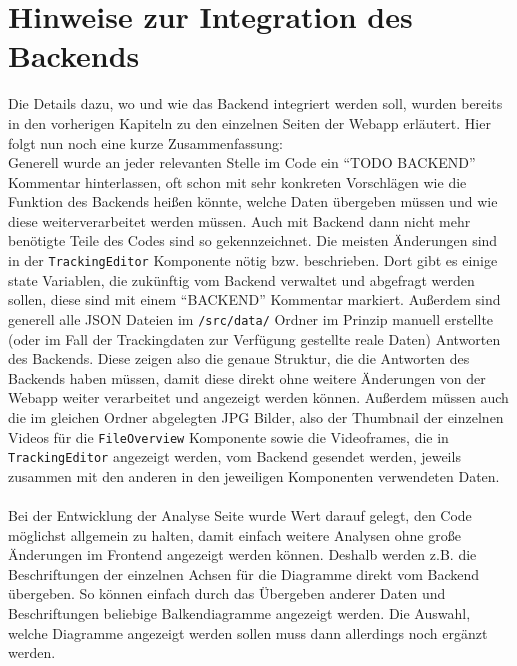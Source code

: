 \chapter{Hinweise zur Integration des Backends}\label{chapter:backend-integration}

Die Details dazu, wo und wie das Backend integriert werden soll, wurden bereits in den vorherigen Kapiteln zu den einzelnen Seiten der Webapp erläutert. Hier folgt nun noch eine kurze Zusammenfassung:\\

Generell wurde an jeder relevanten Stelle im Code ein ``TODO BACKEND'' Kommentar hinterlassen, oft schon mit sehr konkreten Vorschlägen wie die Funktion des Backends heißen könnte, welche Daten übergeben müssen und wie diese weiterverarbeitet werden müssen. Auch mit Backend dann nicht mehr benötigte Teile des Codes sind so gekennzeichnet. Die meisten Änderungen sind in der \texttt{TrackingEditor} Komponente nötig bzw. beschrieben. Dort gibt es einige state Variablen, die zukünftig vom Backend verwaltet und abgefragt werden sollen, diese sind mit einem ``BACKEND'' Kommentar markiert. Außerdem sind generell alle JSON Dateien im \texttt{/src/data/} Ordner im Prinzip manuell erstellte (oder im Fall der Trackingdaten zur Verfügung gestellte reale Daten) Antworten des Backends. Diese zeigen also die genaue Struktur, die die Antworten des Backends haben müssen, damit diese direkt ohne weitere Änderungen von der Webapp weiter verarbeitet und angezeigt werden können. Außerdem müssen auch die im gleichen Ordner abgelegten JPG Bilder, also der Thumbnail der einzelnen Videos für die \texttt{FileOverview} Komponente sowie die Videoframes, die in \texttt{TrackingEditor} angezeigt werden, vom Backend gesendet werden, jeweils zusammen mit den anderen in den jeweiligen Komponenten verwendeten Daten.\\
\\
Bei der Entwicklung der Analyse Seite wurde Wert darauf gelegt, den Code möglichst allgemein zu halten, damit einfach weitere Analysen ohne große Änderungen im Frontend angezeigt werden können. Deshalb werden z.B. die Beschriftungen der einzelnen Achsen für die Diagramme direkt vom Backend übergeben. So können einfach durch das Übergeben anderer Daten und Beschriftungen beliebige Balkendiagramme angezeigt werden. Die Auswahl, welche Diagramme angezeigt werden sollen muss dann allerdings noch ergänzt werden. \\
\\
